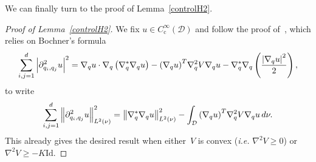 \documentclass{article}
\newcommand{\cD}{\mathcal{D}}
\newcommand{\Id}{\mathrm{Id}}
\renewcommand{\geq}{\geqslant}
\begin{document}
We can finally turn to the proof of Lemma~\ref{controlH2}. %

\begin{proof}[Proof of Lemma~\ref{controlH2}]
We fix $u \in C_\mathrm{c}^\infty(\cD)$ and follow the proof of~\cite[Lemma~2.3]{CLW19}, which relies on Bochner's formula 
\[
\sum_{i,j=1}^{d} \abs{\partial_{q_i,q_j}^2 u}^2 = \nabla_q u\cdot \nabla_q \left( \nabla^{*}_q\nabla_q u\right) - \qty(\nabla_q u)^T\nabla_q^2 V \nabla_q u-\nabla_q^{*}\nabla_q\left(\frac{\abs{\nabla_q u}^2}{2}\right),
\]
to write 
\begin{equation}
  \label{Bochnereq}
  \sum_{i,j=1}^{d} \left\|\partial_{q_i,q_j}^2 u\right\|^2_{L^2(\nu)} = \left\|\nabla_q^{*}\nabla_q u\right\|^2_{L^2(\nu)} - \int_\cD \qty(\nabla_q u)^T \nabla_q^2 V \nabla_q u \,  d\nu.
\end{equation}
This already gives the desired result when either~$V$ is convex (\emph{i.e.} $\nabla^2 V \geq 0$) or $\nabla^2 V \geq -K \Id$.


\end{proof}
\end{document}
